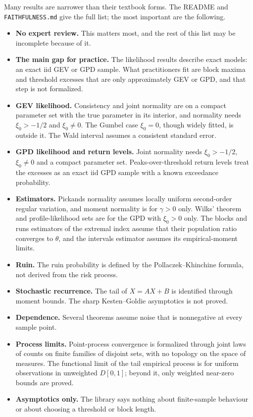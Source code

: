 \documentclass[11pt]{article}
\begin{document}
Many results are narrower than their textbook forms. The README and \texttt{FAITHFULNESS.md} give the full list; the most important are the following.
\begin{itemize}
  \item \textbf{No expert review.} This matters most, and the rest of this list may be incomplete because of it.
  \item \textbf{The main gap for practice.} The likelihood results describe exact models: an exact iid GEV or GPD sample. What practitioners fit are block maxima and threshold excesses that are only approximately GEV or GPD, and that step is not formalized.
  \item \textbf{GEV likelihood.} Consistency and joint normality are on a compact parameter set with the true parameter in its interior, and normality needs $\xi_0>-1/2$ and $\xi_0\ne 0$. The Gumbel case $\xi_0=0$, though widely fitted, is outside it. The Wald interval assumes a consistent standard error.
  \item \textbf{GPD likelihood and return levels.} Joint normality needs $\xi_0>-1/2$, $\xi_0\neq 0$ and a compact parameter
    set. Peaks-over-threshold return levels treat the excesses as an exact iid GPD sample with a known exceedance probability.
  \item \textbf{Estimators.} Pickands normality assumes locally uniform second-order regular variation, and moment normality is for $\gamma>0$ only. Wilks' theorem and profile-likelihood sets are for the GPD with $\xi_0>0$ only. The blocks and runs estimators of the extremal index assume that their population ratio converges to $\theta$, and the intervals estimator assumes its empirical-moment limits.
  \item \textbf{Ruin.} The ruin probability is defined by the Pollaczek--Khinchine formula, not derived from the risk process.
  \item \textbf{Stochastic recurrence.} The tail of $X=AX+B$ is identified through moment bounds. The sharp Kesten--Goldie
    asymptotics is not proved.
  \item \textbf{Dependence.} Several theorems assume noise that is nonnegative at every sample point.
  \item \textbf{Process limits.} Point-process convergence is formalized through joint laws of counts on finite families of
    disjoint sets, with no topology on the space of measures. The functional limit of the tail empirical process is for uniform observations in
    unweighted $D[0,1]$; beyond it, only weighted near-zero bounds are proved.
  \item \textbf{Asymptotics only.} The library says nothing about finite-sample behaviour or about choosing a threshold or block length.
\end{itemize}
\end{document}

